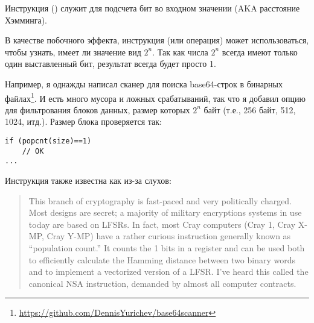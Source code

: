 \label{POPCNT}

Инструкция  () служит для подсчета бит во входном значении (\ac{AKA} расстояние Хэмминга).

В качестве побочного эффекта, инструкция  (или операция) может использоваться, чтобы узнать,
имеет ли значение вид $2^n$.
Так как числа $2^n$ всегда имеют только один выставленный бит, результат  всегда будет просто 1.

Например, я однажды написал сканер для поиска base64-строк в бинарных файлах\footnote{\url{https://github.com/DennisYurichev/base64scanner}}.
И есть много мусора и ложных срабатываний, так что я добавил опцию для фильтрования блоков данных, размер которых $2^n$ байт
(т.е., 256 байт, 512, 1024, итд.).
Размер блока проверяется так:

\begin{lstlisting}[style=customc]
if (popcnt(size)==1)
	// OK
...
\end{lstlisting}

Инструкция также известна как  из-за слухов:

\begin{framed}
\begin{quotation}
  This branch of cryptography is fast-paced and very politically charged.
  Most designs are secret; a majority of military encryptions systems in use today are 
  based on LFSRs. 
  In fact, most Cray computers (Cray 1, Cray X-MP, Cray Y-MP) have a rather curious 
  instruction generally known as “population count.” It counts the 1 bits in a register 
  and can be used both to efficiently calculate the Hamming distance between two binary 
  words and to implement a vectorized version of a LFSR. I’ve heard this called the canonical 
  NSA instruction, demanded by almost all computer contracts.
\end{quotation}
\end{framed}
\InSqBrackets{\Schneier{}}

